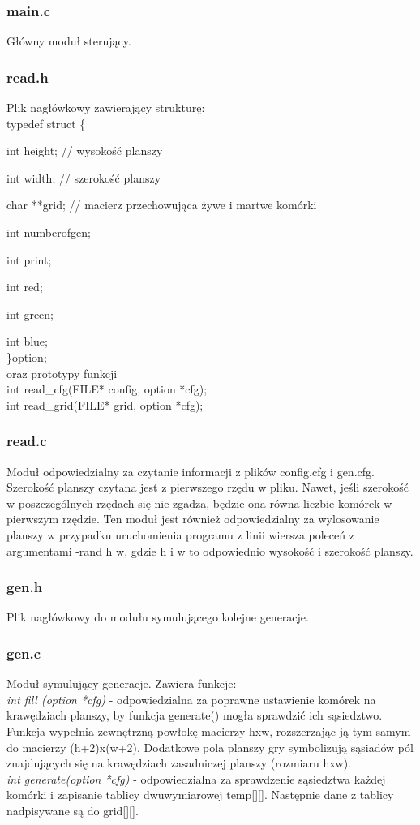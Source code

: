 \documentclass{article}
\begin{document}
\subsubsection*{main.c}
Główny moduł sterujący. 
\subsubsection*{read.h}
Plik nagłówkowy zawierający strukturę:\\
typedef struct \{\par
int height; // wysokość planszy\par
	int width; // szerokość planszy\par
	char **grid; // macierz przechowująca żywe i martwe komórki\par
	int numberofgen;\par
	int print;\par
	int red;\par
	int green;\par
	int blue;\\
\}option;\\
oraz prototypy funkcji \\
int read\_cfg(FILE* config, option *cfg);\\
int read\_grid(FILE* grid, option *cfg);\\
\subsubsection*{read.c}
Moduł odpowiedzialny za czytanie informacji z plików config.cfg i gen.cfg. Szerokość planszy czytana jest z pierwszego rzędu w pliku. Nawet, jeśli szerokość w poszczególnych rzędach się nie zgadza, będzie ona równa liczbie komórek w pierwszym rzędzie. Ten moduł jest również odpowiedzialny za wylosowanie planszy w przypadku uruchomienia programu z linii wiersza poleceń z argumentami -rand h w, gdzie h i w to odpowiednio wysokość i szerokość planszy.
\subsubsection*{gen.h}
Plik nagłówkowy do modułu symulującego kolejne generacje.
\subsubsection*{gen.c}
Moduł symulujący generacje. Zawiera funkcje:\\
\emph{int fill (option *cfg) }- odpowiedzialna za poprawne ustawienie komórek na krawędziach planszy, by funkcja generate() mogła sprawdzić ich sąsiedztwo. Funkcja wypełnia zewnętrzną powłokę macierzy hxw, rozszerzając ją tym samym do macierzy (h+2)x(w+2). Dodatkowe pola planszy gry symbolizują sąsiadów pól znajdujących się na krawędziach zasadniczej planszy (rozmiaru hxw). \\
\emph{int  generate(option *cfg)} - odpowiedzialna za sprawdzenie sąsiedztwa każdej komórki i zapisanie tablicy dwuwymiarowej temp[][]. Następnie dane z tablicy nadpisywane są do grid[][].
\end{document}

